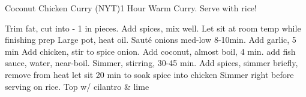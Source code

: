 \documentclass[a6paper,landscape]{article}
\begin{document}
\begin{recipe}{Coconut Chicken Curry        (NYT)}{1 Hour}{}
  \freeform Warm Curry. Serve with rice! 

  Trim fat, cut into  - 1 in pieces. Add spices, mix well. Let sit at room temp while finishing prep
  Large pot, heat oil. Sauté onions med-low 8-10min. Add garlic, 5 min
  Add chicken, stir to spice onion. Add coconut, almost boil, 4 min. add fish sauce, water, near-boil. 
  Simmer, stirring, 30-45 min. Add spices, simmer briefly, remove from heat
  \newstep let sit 20 min to soak spice into chicken
  Simmer right before serving on rice. Top w/ cilantro & lime
  \end{recipe}
\end{document}
